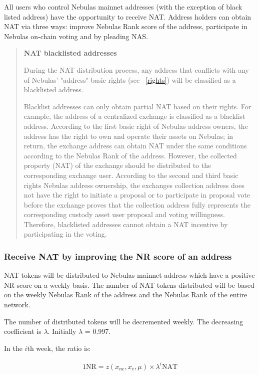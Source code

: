 All users who control Nebulas mainnet addresses (with the exception of black listed address) have the opportunity to receive NAT. Address holders can obtain NAT via three ways: improve Nebulas Rank score of the address, participate in Nebulas on-chain voting and by pleading NAS.

\begin{quotation}

\textbf{NAT blacklisted addresses}

During the NAT distribution process, any address that conflicts with any of Nebulas' "address" basic rights (see ~\ref{rights}) will be classified as a blacklisted address. 

Blacklist addresses can only obtain partial NAT based on their rights. For example, the address of a centralized exchange is classified as a blacklist address. According to the first basic right of Nebulas address owners, the address has the right to own and operate their assets on Nebulas; in return, the exchange address can obtain NAT under the same conditions according to the Nebulas Rank of the address. However, the collected property (NAT) of the exchange should be distributed to the corresponding exchange user. According to the second and third basic rights Nebulas address ownership, the exchanges collection address does not have the right to initiate a proposal or to participate in proposal vote before the exchange proves that the collection address fully represents the corresponding custody asset user proposal and voting willingness. Therefore, blacklisted addresses cannot obtain a NAT incentive by participating in the voting.

\end{quotation}

\subsubsection{Receive NAT by improving the NR score of an address}

NAT tokens will be distributed to Nebulas mainnet address which have a positive NR score on a weekly basis. The number of NAT tokens distributed will be based on the weekly Nebulas Rank of the address and the Nebulas Rank of the entire network.

The number of distributed tokens will be decremented weekly. The decreasing coefficient is $\lambda$. Initially $\lambda$ = 0.997.

In the $i$th week, the ratio is:

\begin{align}
1 \text{NR}=z(x_{ne},x_{e},\mu)\times\lambda^{i} \text{NAT}
\end{align} 

